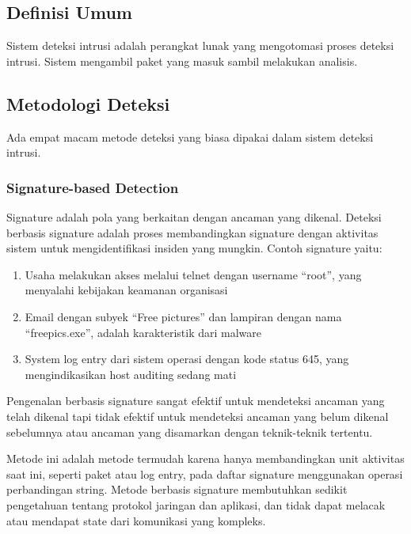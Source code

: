   \subsection{Definisi Umum}

  Sistem deteksi intrusi adalah perangkat lunak yang mengotomasi proses deteksi intrusi. Sistem mengambil paket yang masuk sambil melakukan analisis.  \\

  \subsection{Metodologi Deteksi}

  Ada empat macam metode deteksi yang biasa dipakai dalam sistem deteksi intrusi.

    \subsubsection{Signature-based Detection}

    Signature adalah pola yang berkaitan dengan ancaman yang dikenal. Deteksi berbasis signature adalah proses membandingkan signature dengan aktivitas sistem untuk mengidentifikasi insiden yang mungkin. Contoh signature yaitu:

    \begin{enumerate}
      \item Usaha melakukan akses melalui telnet dengan username “root”, yang menyalahi kebijakan keamanan organisasi
      \item Email dengan subyek “Free pictures” dan lampiran dengan nama “freepics.exe”, adalah karakteristik dari malware
      \item System log entry dari sistem operasi dengan kode status 645, yang mengindikasikan host auditing sedang mati
    \end{enumerate}


    Pengenalan berbasis signature sangat efektif untuk mendeteksi ancaman yang telah dikenal tapi tidak efektif untuk mendeteksi ancaman yang belum dikenal sebelumnya atau ancaman yang disamarkan dengan teknik-teknik tertentu.

    Metode ini adalah metode termudah karena hanya membandingkan unit aktivitas saat ini, seperti paket atau log entry, pada daftar signature menggunakan operasi perbandingan string. Metode berbasis signature membutuhkan sedikit pengetahuan tentang protokol jaringan dan aplikasi, dan tidak dapat melacak atau mendapat state dari komunikasi yang kompleks.

